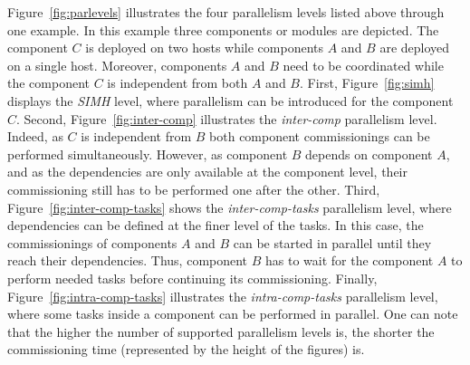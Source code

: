 Figure~\ref{fig:parlevels} illustrates the four parallelism levels
listed above through one example. In this example three components or modules are
depicted. The component $C$ is deployed on two hosts while components
$A$ and $B$ are deployed on a single host. Moreover, components $A$
and $B$ need to be coordinated while the component $C$ is independent
from both $A$ and $B$. First, Figure~\ref{fig:simh} displays
the \emph{SIMH} level, where parallelism can be introduced for the
component $C$. Second, Figure~\ref{fig:inter-comp} illustrates the
\emph{inter-comp} parallelism level. Indeed, as $C$ is independent from
$B$ both component commissionings can be performed
simultaneously. However, as component $B$ depends on component $A$,
and as the dependencies are only available at the component level,
their commissioning still has to be performed one after the
other. Third, Figure~\ref{fig:inter-comp-tasks} shows the
\emph{inter-comp-tasks} parallelism level, where dependencies can be
defined at the finer level of the tasks. In this case, the commissionings
of components $A$ and $B$ can be started in parallel until they reach
their dependencies. Thus, component $B$ has to wait for the component
$A$ to perform needed tasks before continuing its
commissioning. Finally, Figure~\ref{fig:intra-comp-tasks} illustrates
the \emph{intra-comp-tasks} parallelism level, where some tasks inside
a component can be performed in parallel. One can note that the
higher the number of supported parallelism levels is, the shorter
the commissioning time (represented by the height of the figures) is.

